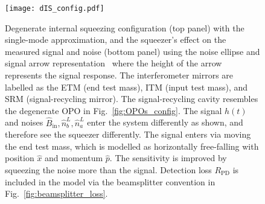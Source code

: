 \begin{figure}
	\centering
	\texttt{[image: dIS\_config.pdf]}
	\caption{ Degenerate internal squeezing configuration (top panel) with the single-mode approximation, and the squeezer's effect on the measured signal and noise (bottom panel) using the noise ellipse and signal arrow representation~\cite{} where the height of the arrow represents the signal response.
	The interferometer mirrors are labelled as the ETM (end test mass), ITM (input test mass), and SRM (signal-recycling mirror). The signal-recycling cavity resembles the degenerate OPO in Fig.~\ref{fig:OPOs_config}. The signal $h(t)$ and noises $\hat{B}_\text{in},\hat{n}^L_b,\hat{n}^L_a$ enter the system differently as shown, and therefore see the squeezer differently. The signal enters via moving the end test mass, which is modelled as horizontally free-falling with position $\hat x$ and momentum $\hat p$. The sensitivity is improved by squeezing the noise more than the signal. Detection loss $R_\text{PD}$ is included in the model via the beamsplitter convention in Fig.~\ref{fig:beamsplitter_loss}.}
	\label{fig:dIS_config}
\end{figure}

